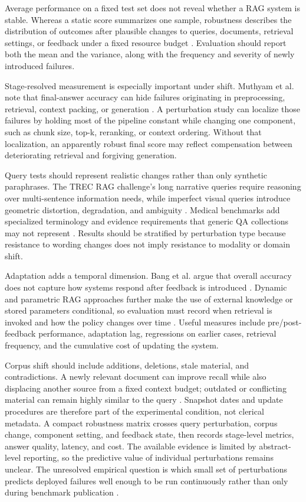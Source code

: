 \documentclass[a4paper,11pt]{article}
\begin{document}
Average performance on a fixed test set does not reveal whether a RAG system is stable. Whereas a static score summarizes one sample, robustness describes the distribution of outcomes after plausible changes to queries, documents, retrieval settings, or feedback under a fixed resource budget \citep{Muthyam2026Systems,Zhang2026Before,Bang2026Feedback}. Evaluation should report both the mean and the variance, along with the frequency and severity of newly introduced failures.

Stage-resolved measurement is especially important under shift. Muthyam et al. note that final-answer accuracy can hide failures originating in preprocessing, retrieval, context packing, or generation \citep{Muthyam2026Systems}. A perturbation study can localize those failures by holding most of the pipeline constant while changing one component, such as chunk size, top-k, reranking, or context ordering. Without that localization, an apparently robust final score may reflect compensation between deteriorating retrieval and forgiving generation.

Query tests should represent realistic changes rather than only synthetic paraphrases. The TREC RAG challenge's long narrative queries require reasoning over multi-sentence information needs, while imperfect visual queries introduce geometric distortion, degradation, and ambiguity \citep{Upadhyay2026Overview,Zhang2026Before}. Medical benchmarks add specialized terminology and evidence requirements that generic QA collections may not represent \citep{Li2026Mrag}. Results should be stratified by perturbation type because resistance to wording changes does not imply resistance to modality or domain shift.

Adaptation adds a temporal dimension. Bang et al. argue that overall accuracy does not capture how systems respond after feedback is introduced \citep{Bang2026Feedback}. Dynamic and parametric RAG approaches further make the use of external knowledge or stored parameters conditional, so evaluation must record when retrieval is invoked and how the policy changes over time \citep{Su2025Dynamic}. Useful measures include pre/post-feedback performance, adaptation lag, regressions on earlier cases, retrieval frequency, and the cumulative cost of updating the system.

Corpus shift should include additions, deletions, stale material, and contradictions. A newly relevant document can improve recall while also displacing another source from a fixed context budget; outdated or conflicting material can remain highly similar to the query \citep{Javadi2025Contradictions}. Snapshot dates and update procedures are therefore part of the experimental condition, not clerical metadata. A compact robustness matrix crosses query perturbation, corpus change, component setting, and feedback state, then records stage-level metrics, answer quality, latency, and cost. The available evidence is limited by abstract-level reporting, so the predictive value of individual perturbations remains unclear. The unresolved empirical question is which small set of perturbations predicts deployed failures well enough to be run continuously rather than only during benchmark publication \citep{Muthyam2026Systems,Bang2026Feedback,Zhang2026Before}.
\end{document}
